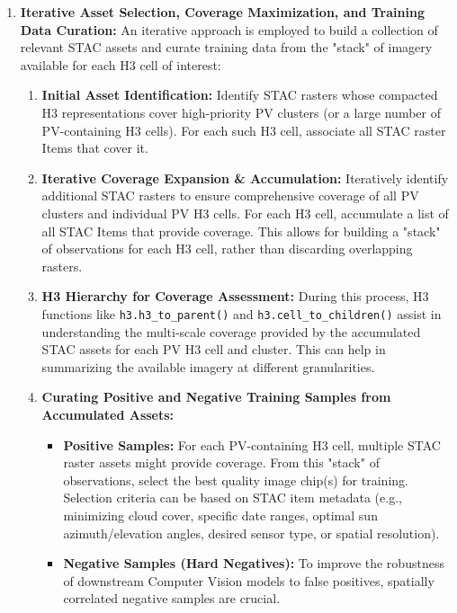 \begin{enumerate}
    \item \textbf{Iterative Asset Selection, Coverage Maximization, and Training Data Curation:}
        An iterative approach is employed to build a collection of relevant STAC assets and curate training data from the "stack" of imagery available for each H3 cell of interest:
        \begin{enumerate}
            \item \textbf{Initial Asset Identification:} Identify STAC rasters whose compacted H3 representations cover high-priority PV clusters (or a large number of PV-containing H3 cells). For each such H3 cell, associate all STAC raster Items that cover it.
            \item \textbf{Iterative Coverage Expansion \& Accumulation:} Iteratively identify additional STAC rasters to ensure comprehensive coverage of all PV clusters and individual PV H3 cells. 
            For each H3 cell, accumulate a list of all STAC Items that provide coverage. This allows for building a "stack" of observations for each H3 cell, rather than discarding overlapping rasters.
            \item \textbf{H3 Hierarchy for Coverage Assessment:} During this process, H3 functions like \texttt{h3.h3\_to\_parent()} and \texttt{h3.cell\_to\_children()} assist in understanding the multi-scale coverage provided by the accumulated STAC assets for each PV H3 cell and cluster. 
            This can help in summarizing the available imagery at different granularities.
            \item \textbf{Curating Positive and Negative Training Samples from Accumulated Assets:}
            \begin{itemize}
                \item \textbf{Positive Samples:} For each PV-containing H3 cell, multiple STAC raster assets might provide coverage. 
                From this "stack" of observations, select the best quality image chip(s) for training. Selection criteria can be based on STAC item metadata (e.g., minimizing cloud cover, specific date ranges, optimal sun azimuth/elevation angles, desired sensor type, or spatial resolution). 
                \item \textbf{Negative Samples (Hard Negatives):} To improve the robustness of downstream Computer Vision models to false positives, spatially correlated negative samples are crucial\cite{kruitwagen_global_inventory_pv_units_2021, robinson_ms_planet_global_renewables_watch_2025, yang_GloSoFarID_2024}\cite{feng_10m_S2_China_2024}. 

\end{itemize}
\end{enumerate}
\end{enumerate}

